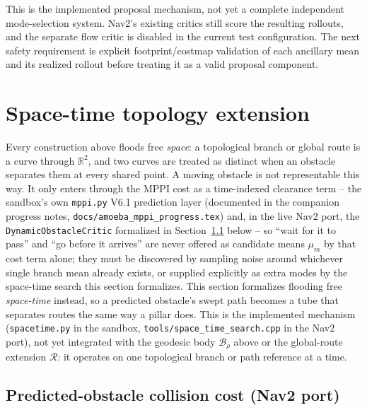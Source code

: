\documentclass[11pt,a4paper]{article}
\newcommand{\R}{\mathbb{R}}
\newcommand{\B}{\mathcal{B}}
\begin{document}
This is the implemented proposal mechanism, not yet a complete independent
mode-selection system. Nav2's existing critics still score the resulting
rollouts, and the separate flow critic is disabled in the current test
configuration. The next safety requirement is explicit footprint/costmap
validation of each ancillary mean and its realized rollout before treating it
as a valid proposal component.

\section{Space-time topology extension}
\label{sec:spacetime}

Every construction above floods free \emph{space}: a topological branch or
global route is a curve through $\R^2$, and two curves are treated as distinct when
an obstacle separates them at every shared point. A moving obstacle is not
representable this way. It only enters through the MPPI cost as a
time-indexed clearance term -- the sandbox's own \texttt{mppi.py} V6.1
prediction layer (documented in the companion progress notes,
\texttt{docs/amoeba\_mppi\_progress.tex}) and, in the live Nav2 port, the
\texttt{DynamicObstacleCritic} formalized in
Section~\ref{sec:dynamic-obstacle-cost} below -- so ``wait for it to pass''
and ``go before it arrives'' are never offered as candidate means $\mu_m$ by
that cost term alone; they must be discovered by sampling noise around
whichever single branch mean already exists, or supplied explicitly as extra
modes by the space-time search this section formalizes. This section
formalizes flooding free \emph{space-time} instead, so a predicted
obstacle's swept path becomes a tube that separates routes the same way a
pillar does. This is the implemented mechanism (\texttt{spacetime.py} in the
sandbox, \texttt{tools/space\_time\_search.cpp} in the Nav2 port), not yet
integrated with the geodesic body $\B_\rho$ above or the global-route
extension $\mathcal R$: it operates on one topological branch or path
reference at a time.

\subsection{Predicted-obstacle collision cost (Nav2 port)}
\label{sec:dynamic-obstacle-cost}
\end{document}
